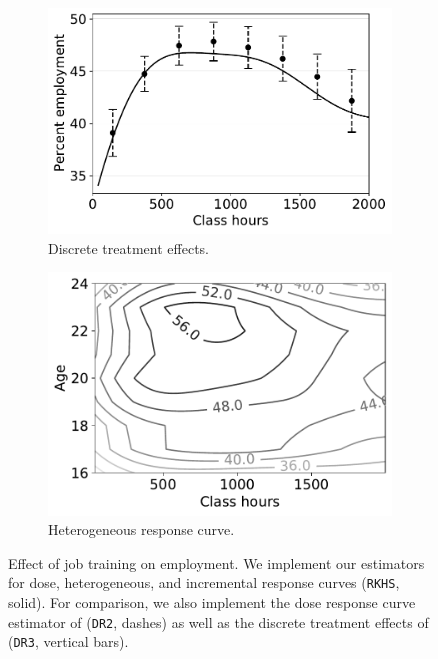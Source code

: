\begin{figure}[ht]
\begin{centering}
     \begin{subfigure}[b]{0.45\textwidth}
         \centering
         \includegraphics[width=\textwidth]{img/ATE_JCdata_d_filter_ci_fine_gaussian2_bma.pdf}
         \caption{Discrete treatment effects.}
     \end{subfigure}
     \hfill
     \begin{subfigure}[b]{0.45\textwidth}
         \centering
         \includegraphics[width=\textwidth]{img/CATE_Age_JCdata_d_filter_bma.pdf}
         \caption{Heterogeneous response curve.}
     \end{subfigure}
\par
\caption{\label{fig:JC}
Effect of job training on employment. We implement our estimators for dose, heterogeneous, and incremental response curves (\texttt{RKHS}, solid). For comparison, we also implement the dose response curve estimator of \cite{colangelo2020double} (\texttt{DR2}, dashes) as well as the discrete treatment effects of \cite{singh2021debiased} (\texttt{DR3}, vertical bars).}
\end{centering}
\end{figure}

